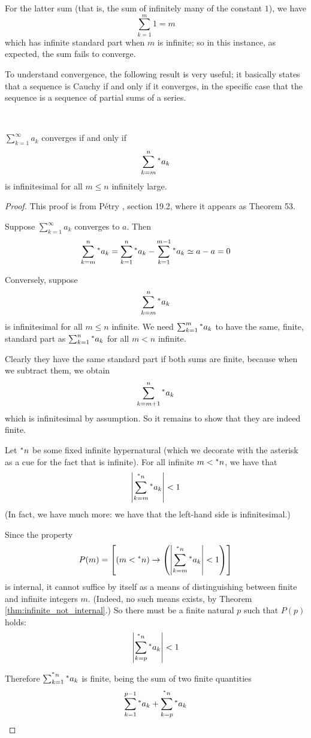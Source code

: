 \documentclass[11pt]{amsart}
\theoremstyle{remark}
\newcommand{\hyp}[1][\mathbb{R}]{\prescript{*}{}{#1}}
\newcommand{\near}{\simeq}
\begin{document}
For the latter sum (that is, the sum of infinitely many of the constant $1$), we have $$\sum_{k=1}^{m} 1 = m$$ which has infinite standard part when $m$ is infinite; so in this instance, as expected, the sum fails to converge.

To understand convergence, the following result is very useful; it basically states that a sequence is Cauchy if and only if it converges, in the specific case that the sequence is a sequence of partial sums of a series.

\

\begin{thm} \label{thm:cauchycriterion} $\sum_{k=1}^{\infty} a_k$ converges if and only if $$\sum_{k=m}^n \hyp[a]_k$$ is infinitesimal for all $m \leq n$ infinitely large.
\end{thm}
\begin{proof}
This proof is from P\'etry \cite{petry}, section 19.2, where it appears as Theorem 53.

Suppose $\sum_{k=1}^{\infty} a_k$ converges to $a$.
Then $$\sum_{k=m}^n \hyp[a]_k = \sum_{k=1}^n \hyp[a]_k - \sum_{k=1}^{m-1} \hyp[a]_k \near a-a = 0$$

Conversely, suppose $$\sum_{k=m}^n \hyp[a]_k$$ is infinitesimal for all $m \leq n$ infinite.
We need $\sum_{k=1}^m \hyp[a]_k$ to have the same, finite, standard part as $\sum_{k=1}^n \hyp[a]_k$ for all $m < n$ infinite.

Clearly they have the same standard part if both sums are finite, because when we subtract them, we obtain $$\sum_{k=m+1}^{n} \hyp[a]_k$$ which is infinitesimal by assumption.
So it remains to show that they are indeed finite.

Let $\hyp[n]$ be some fixed infinite hypernatural (which we decorate with the asterisk as a cue for the fact that is infinite).
For all infinite $m < \hyp[n]$, we have that $$\left| \sum_{k=m}^{\hyp[n]} \hyp[a]_k \right| < 1$$
(In fact, we have much more: we have that the left-hand side is infinitesimal.)

Since the property $$P(m) = \left[ (m < \hyp[n]) \rightarrow \left( \left| \sum_{k=m}^{\hyp[n]} \hyp[a]_k \right| < 1 \right) \right]$$ is internal, it cannot suffice by itself as a means of distinguishing between finite and infinite integers $m$.
(Indeed, no such means exists, by Theorem \ref{thm:infinite_not_internal}.)
So there must be a finite natural $p$ such that $P(p)$ holds: $$\left| \sum_{k=p}^{\hyp[n]} \hyp[a]_k \right| < 1$$

Therefore $\sum_{k=1}^{\hyp[n]} \hyp[a]_k$ is finite, being the sum of two finite quantities $$\sum_{k=1}^{p-1} \hyp[a]_k + \sum_{k=p}^{\hyp[n]} \hyp[a]_k$$
\end{proof}
\end{document}
